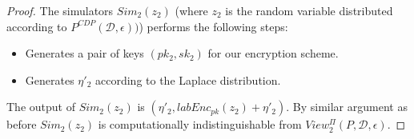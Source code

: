 \begin{proof}
The simulators $Sim_2 (z_2)$ (where $z_2$ is the random
variable distributed according to $P^{CDP}(\mathcal{D},\epsilon))$) performs the following steps:
\begin{itemize}
\item Generates a pair of keys $(pk_2,sk_2)$ for our encryption scheme.

\item Generates $\eta'_2$ according to the Laplace distribution.
\end{itemize}
The output of $Sim_2 (z_2)$ is $(\eta'_2,labEnc_{pk}(z_2)+\eta'_2)$.
By similar argument as before $Sim_2 (z_2)$ is computationally indistinguishable 
from $View_2^{\Pi}(P,\mathcal{D},\epsilon)$.
\end{proof}











